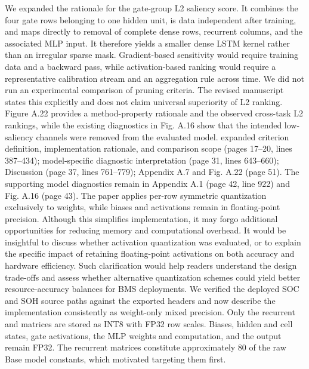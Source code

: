 {} We expanded the rationale for the gate-group L2 saliency score. It combines the four gate rows belonging to one hidden unit, is data independent after training, and maps directly to removal of complete dense rows, recurrent columns, and the associated MLP input. It therefore yields a smaller dense LSTM kernel rather than an irregular sparse mask. Gradient-based sensitivity would require training data and a backward pass, while activation-based ranking would require a representative calibration stream and an aggregation rule across time.\markdownRendererParagraphSeparator
{}We did not run an experimental comparison of pruning criteria. The revised manuscript states this explicitly and does not claim universal superiority of L2 ranking. Figure A.22 provides a method-property rationale and the observed cross-task L2 rankings, while the existing diagnostics in Fig. A.16 show that the intended low-saliency channels were removed from the evaluated model.\markdownRendererParagraphSeparator
{} expanded criterion definition, implementation rationale, and comparison scope (pages 17--20, lines 387--434); model-specific diagnostic interpretation (page 31, lines 643--660); Discussion (page 37, lines 761--779); Appendix A.7 and Fig. A.22 (page 51). The supporting model diagnostics remain in Appendix A.1 (page 42, line 922) and Fig. A.16 (page 43).\markdownRendererInterblockSeparator
{}
\markdownRendererSectionEnd \markdownRendererSectionBegin
{}\markdownRendererInterblockSeparator
{}\markdownRendererBlockQuoteBegin
The paper applies per-row symmetric quantization exclusively to weights, while biases and activations remain in floating-point precision. Although this simplifies implementation, it may forgo additional opportunities for reducing memory and computational overhead. It would be insightful to discuss whether activation quantization was evaluated, or to explain the specific impact of retaining floating-point activations on both accuracy and hardware efficiency. Such clarification would help readers understand the design trade-offs and assess whether alternative quantization schemes could yield better resource-accuracy balances for BMS deployments.\markdownRendererBlockQuoteEnd \markdownRendererInterblockSeparator
{} We verified the deployed SOC and SOH source paths against the exported headers and now describe the implementation consistently as weight-only mixed precision. Only the recurrent  and  matrices are stored as INT8 with FP32 row scales. Biases, hidden and cell states, gate activations, the MLP weights and computation, and the output remain FP32. The recurrent matrices constitute approximately 80\markdownRendererPercentSign{} of the raw Base model constants, which motivated targeting them first.\markdownRendererParagraphSeparator
